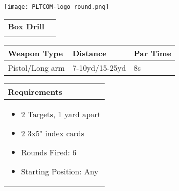 \documentclass[../Cover.tex]{subfiles}
\begin{document}
	\begin{minipage}[t][0.2\textheight][t]{0.1\textwidth} 
		\texttt{[image: PLTCOM-logo\_round.png]}
	\end{minipage}
	\hfill
	\begin{minipage}[t][0.2\textheight][t]{0.8\textwidth}
		\begin{tabular}{ p{} l  }		
			\\	
			\textbf{Box Drill} \\
			\\[0.09\textheight]
		\end{tabular}
		\quad
		\begin{tabular}{ | p{} | p{} | p{} |}
			\hline
			\rowcolor[HTML]{C0C0C0}\tiny Weapon Type & \tiny Distance & \tiny Par Time\\ 
			\hline
			\tiny Pistol/Long arm & \tiny 7-10yd/15-25yd & \tiny 8s \\ %
			\hline
		\end{tabular}
	\end{minipage}
	\begin{tabular}{p{}}
		\small Requirements \\
		\hline
		\tiny \begin{itemize} %
			\item 2 Targets, 1 yard apart
			\item 2 3x5" index cards
			\item Rounds Fired: 6
			\item Starting Position: Any
		\end{itemize}
		\begin{center}
						
		\end{center}
		\\[0.6\textheight]
	\end{tabular}
\end{document}
